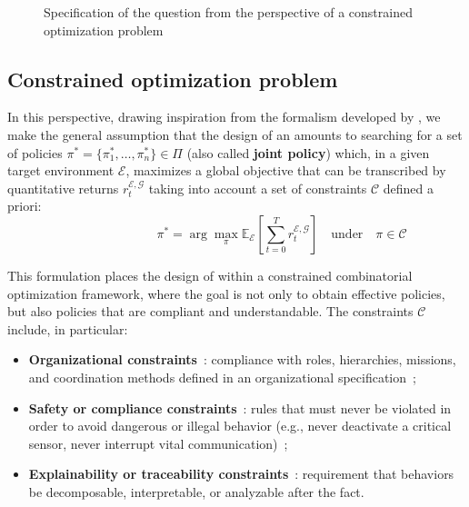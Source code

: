\begin{figure}[h!]
  \centering
  \resizebox{\textwidth}{!}{%
    
  }
  \caption{Specification of the question from the perspective of a constrained optimization problem}
  \label{fig:constrained_optimization_overview}
\end{figure}

\subsection{Constrained optimization problem}

In this perspective, drawing inspiration from the formalism developed by , we make the general assumption that the design of an  amounts to searching for a set of policies $\pi^* = \{\pi^*_1, \dots, \pi^*_n\} \in \Pi$ (also called \textbf{joint policy}) which, in a given target environment $\mathcal{E}$, maximizes a global objective that can be transcribed by quantitative returns $r^{\mathcal{E}, \mathcal{G}}_t$ taking into account a set of constraints $\mathcal {C}$ defined a priori:
%
\[
  \hspace{3cm}\pi^* = \arg\max_{\pi} \mathbb{E}_{\mathcal{E}} \left[ \sum_{t=0}^{T} r^{\mathcal{E}, \mathcal{G}}_t \right] \quad \text{under} \quad \pi \in \mathcal{C}
\]

\noindent
This formulation places the design of  within a constrained combinatorial optimization framework, where the goal is not only to obtain effective policies, but also policies that are compliant and understandable.
%
The constraints $\mathcal{C}$ include, in particular:
\begin{itemize}
  \item \textbf{Organizational constraints}~: compliance with roles, hierarchies, missions, and coordination methods defined in an organizational specification~;
  \item \textbf{Safety or compliance constraints}~: rules that must never be violated in order to avoid dangerous or illegal behavior (e.g., never deactivate a critical sensor, never interrupt vital communication)~;
  \item \textbf{Explainability or traceability constraints}~: requirement that behaviors be decomposable, interpretable, or analyzable after the fact.
\end{itemize}

